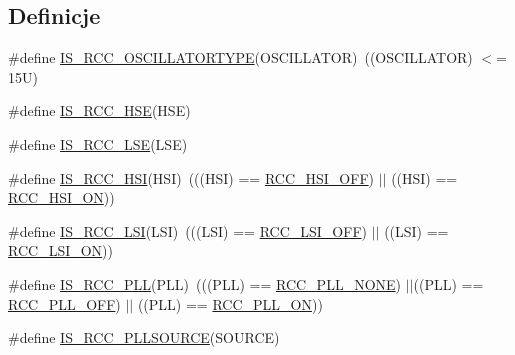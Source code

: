 \subsection*{Definicje}
\begin{DoxyCompactItemize}
\item 
\#define \hyperlink{group___r_c_c___i_s___r_c_c___definitions_ga3da0bb3923503cb8e84e5bd75912fbb8}{I\+S\+\_\+\+R\+C\+C\+\_\+\+O\+S\+C\+I\+L\+L\+A\+T\+O\+R\+T\+Y\+PE}(O\+S\+C\+I\+L\+L\+A\+T\+OR)~((O\+S\+C\+I\+L\+L\+A\+T\+OR) $<$= 15\+U)
\item 
\#define \hyperlink{group___r_c_c___i_s___r_c_c___definitions_ga287bbcafd73d07ec915c2f793301908a}{I\+S\+\_\+\+R\+C\+C\+\_\+\+H\+SE}(H\+SE)
\item 
\#define \hyperlink{group___r_c_c___i_s___r_c_c___definitions_ga95d2678bf8f46e932e7cba75619a4d2c}{I\+S\+\_\+\+R\+C\+C\+\_\+\+L\+SE}(L\+SE)
\item 
\#define \hyperlink{group___r_c_c___i_s___r_c_c___definitions_ga9d2bad5b4ad9ba8fb224ddbd949c27d6}{I\+S\+\_\+\+R\+C\+C\+\_\+\+H\+SI}(H\+SI)~(((H\+SI) == \hyperlink{group___r_c_c___h_s_i___config_ga1b34d37d3b51afec0758b3ddc7a7e665}{R\+C\+C\+\_\+\+H\+S\+I\+\_\+\+O\+FF}) $\vert$$\vert$ ((H\+SI) == \hyperlink{group___r_c_c___h_s_i___config_ga0bf09ef9e46d5da25cced7b3122f92f5}{R\+C\+C\+\_\+\+H\+S\+I\+\_\+\+ON}))
\item 
\#define \hyperlink{group___r_c_c___i_s___r_c_c___definitions_gaaa7381dd9821c69346ce64453863b786}{I\+S\+\_\+\+R\+C\+C\+\_\+\+L\+SI}(L\+SI)~(((L\+SI) == \hyperlink{group___r_c_c___l_s_i___config_gaa1710927d79a2032f87f039c4a27356a}{R\+C\+C\+\_\+\+L\+S\+I\+\_\+\+O\+FF}) $\vert$$\vert$ ((L\+SI) == \hyperlink{group___r_c_c___l_s_i___config_ga6b364ac3500e60b6bff695ee518c87d6}{R\+C\+C\+\_\+\+L\+S\+I\+\_\+\+ON}))
\item 
\#define \hyperlink{group___r_c_c___i_s___r_c_c___definitions_ga373b85039eb8036373fe80948c153ee0}{I\+S\+\_\+\+R\+C\+C\+\_\+\+P\+LL}(P\+LL)~(((P\+LL) == \hyperlink{group___r_c_c___p_l_l___config_gae47a612f8e15c32917ee2181362d88f3}{R\+C\+C\+\_\+\+P\+L\+L\+\_\+\+N\+O\+NE}) $\vert$$\vert$((P\+LL) == \hyperlink{group___r_c_c___p_l_l___config_ga3a8d5c8bcb101c6ca1a574729acfa903}{R\+C\+C\+\_\+\+P\+L\+L\+\_\+\+O\+FF}) $\vert$$\vert$ ((P\+LL) == \hyperlink{group___r_c_c___p_l_l___config_gaf86dbee130304ba5760818f56d34ec91}{R\+C\+C\+\_\+\+P\+L\+L\+\_\+\+ON}))
\item 
\#define \hyperlink{group___r_c_c___i_s___r_c_c___definitions_gae1aef66aae2c0374be3c7c62d389282f}{I\+S\+\_\+\+R\+C\+C\+\_\+\+P\+L\+L\+S\+O\+U\+R\+CE}(S\+O\+U\+R\+CE)

\end{DoxyCompactItemize}

